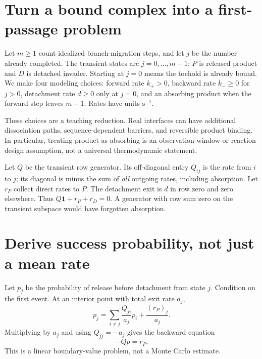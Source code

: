 \section{Turn a bound complex into a first-passage problem}
Let $m\geq1$ count idealized branch-migration steps, and let $j$ be the number
already completed. The transient states are $j=0,\ldots,m-1$; $P$ is released
product and $D$ is detached invader. Starting at $j=0$ means the toehold is
already bound. We make four modeling choices: forward rate $k_+>0$, backward
rate $k_-\geq0$ for $j>0$, detachment rate $d\geq0$ only at $j=0$, and an
absorbing product when the forward step leaves $m-1$. Rates have units
$\mathrm{s}^{-1}$.

These choices are a teaching reduction. Real interfaces can have additional
dissociation paths, sequence-dependent barriers, and reversible product binding.
In particular, treating product as absorbing is an observation-window or
reaction-design assumption, not a universal thermodynamic statement.


Let $Q$ be the transient row generator. Its off-diagonal entry $Q_{ij}$ is
the rate from $i$ to $j$; its diagonal is minus the sum of \emph{all} outgoing
rates, including absorption. Let $r_P$ collect direct rates to $P$. The
detachment exit is $d$ in row zero and zero elsewhere. Thus
$Q\boldsymbol 1+r_P+r_D=0$. A generator with row sum zero on the transient
subspace would have forgotten absorption.

\section{Derive success probability, not just a mean rate}
Let $p_j$ be the probability of release before detachment from state $j$.
Condition on the first event. At an interior point with total exit rate $a_j$,
\[
 p_j=\sum_{i\ne j}\frac{Q_{ji}}{a_j}p_i+\frac{(r_P)_j}{a_j}.
\]
Multiplying by $a_j$ and using $Q_{jj}=-a_j$ gives the backward equation
\begin{equation}
 -Qp=r_P.\label{eq:probability}
\end{equation}
This is a linear boundary-value problem, not a Monte Carlo estimate.

